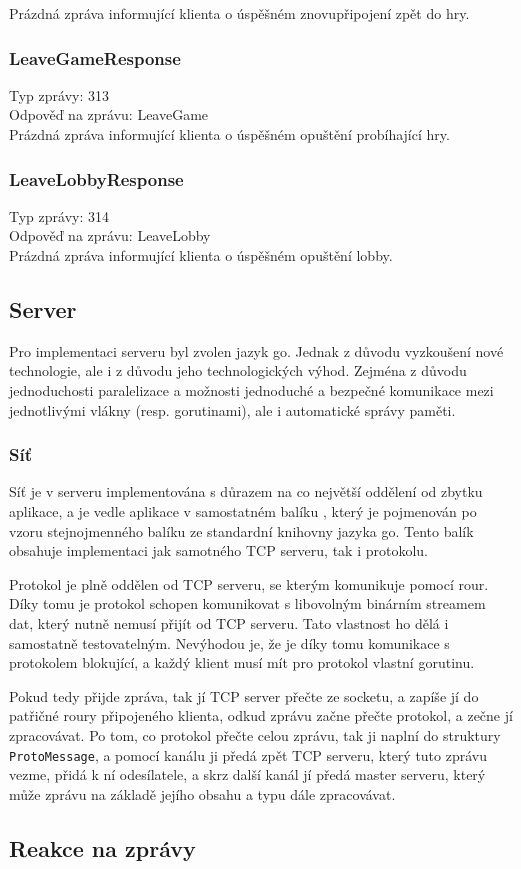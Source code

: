 \documentclass[12pt, a4paper]{article}
\begin{document}
    Prázdná zpráva informující klienta o úspěšném znovupřipojení zpět do hry.


    \subsubsection*{LeaveGameResponse}
    Typ zprávy: 313\\
    Odpověď na zprávu: LeaveGame\\

    Prázdná zpráva informující klienta o úspěšném opuštění probíhající hry.

    \subsubsection*{LeaveLobbyResponse}
    Typ zprávy: 314\\
    Odpověď na zprávu: LeaveLobby\\

    Prázdná zpráva informující klienta o úspěšném opuštění lobby.


    \subsection{Server}
    Pro implementaci serveru byl zvolen jazyk go.
    Jednak z důvodu vyzkoušení nové technologie, ale i z důvodu jeho technologických výhod.
    Zejména z důvodu jednoduchosti paralelizace a možnosti jednoduché a bezpečné komunikace mezi jednotlivými vlákny (resp. gorutinami), ale i automatické správy paměti.

    \subsubsection{Síť}
    Síť je v serveru implementována s důrazem na co největší oddělení od zbytku aplikace, a je vedle aplikace v samostatném balíku , který je pojmenován po vzoru stejnojmenného balíku ze standardní knihovny jazyka go.
    Tento balík obsahuje implementaci jak samotného TCP serveru, tak i protokolu.
    
    Protokol je plně oddělen od TCP serveru, se kterým komunikuje pomocí rour.
    Díky tomu je protokol schopen komunikovat s libovolným binárním streamem dat, který nutně nemusí přijít od TCP serveru.
    Tato vlastnost ho dělá i samostatně testovatelným.
    Nevýhodou je, že je díky tomu komunikace s protokolem blokující, a každý klient musí mít pro protokol vlastní gorutinu.

    Pokud tedy přijde zpráva, tak jí TCP server přečte ze socketu, a zapíše jí do patřičné roury připojeného klienta, odkud zprávu začne přečte protokol, a zečne jí zpracovávat.
    Po tom, co protokol přečte celou zprávu, tak ji naplní do struktury \texttt{ProtoMessage}, a pomocí kanálu ji předá zpět TCP serveru, který tuto zprávu vezme, přidá k ní odesílatele, a skrz další kanál jí předá master serveru, který může zprávu na základě jejího obsahu a typu dále zpracovávat.

    \subsection{Reakce na zprávy}
\end{document}
